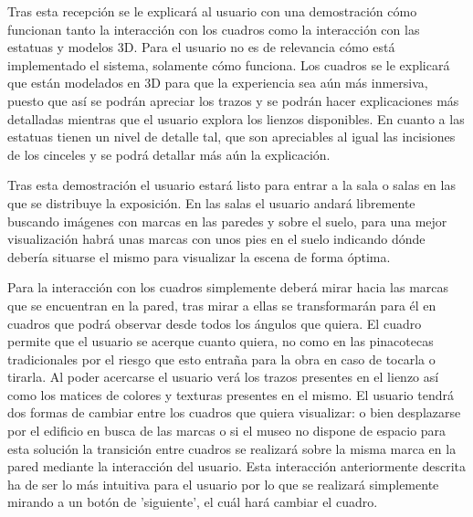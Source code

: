 \documentclass[a4paper,11pt]{article}
\begin{document}
Tras esta recepción se le explicará al usuario con una demostración cómo funcionan tanto la interacción con los cuadros como la interacción con las estatuas y modelos 3D. Para el usuario no es de relevancia cómo está implementado el sistema, solamente cómo funciona. Los cuadros se le explicará que están modelados en 3D para que la experiencia sea aún más inmersiva, puesto que así se podrán apreciar los trazos y se podrán hacer explicaciones más detalladas mientras que el usuario explora los lienzos disponibles. En cuanto a las estatuas tienen un nivel de detalle tal, que son apreciables al igual las incisiones de los cinceles y se podrá detallar más aún la explicación.

Tras esta demostración el usuario estará listo para entrar a la sala o salas en las que se distribuye la exposición. En las salas el usuario andará libremente buscando imágenes con marcas en las paredes y sobre el suelo, para una mejor visualización habrá unas marcas con unos pies en el suelo indicando dónde debería situarse el mismo para visualizar la escena de forma óptima.

Para la interacción con los cuadros simplemente deberá mirar hacia las marcas que se encuentran en la pared, tras mirar a ellas se transformarán para él en cuadros que podrá observar desde todos los ángulos que quiera. El cuadro permite que el usuario se acerque cuanto quiera, no como en las pinacotecas tradicionales por el riesgo que esto entraña para la obra en caso de tocarla o tirarla. Al poder acercarse el usuario verá los trazos presentes en el lienzo así como los matices de colores y texturas presentes en el mismo. El usuario tendrá dos formas de cambiar entre los cuadros que quiera visualizar: o bien desplazarse por el edificio en busca de las marcas o si el museo no dispone de espacio para esta solución la transición entre cuadros se realizará sobre la misma marca en la pared mediante la interacción del usuario. Esta interacción anteriormente descrita ha de ser lo más intuitiva para el usuario por lo que se realizará simplemente mirando a un botón de 'siguiente', el cuál hará cambiar el cuadro.
\end{document}
